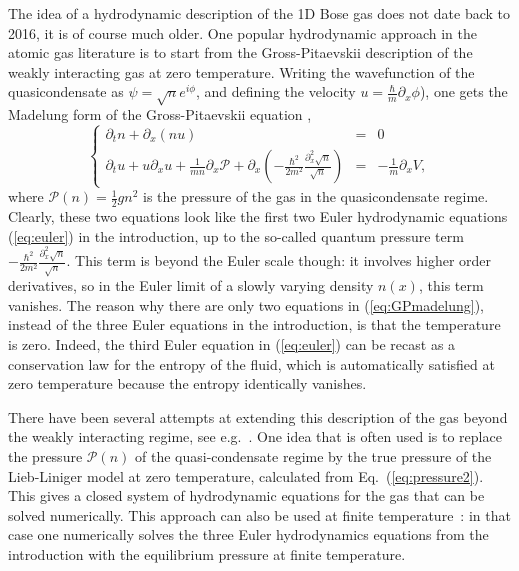 \documentclass[onecolumn,amsfonts,showpacs,superscriptaddress]{revtex4-1}
\begin{document}
The idea of a hydrodynamic description of the 1D Bose gas does not date back to 2016, it is of course much older. One popular hydrodynamic approach in the atomic gas literature is to start from the Gross-Pitaevskii description of the weakly interacting gas at zero temperature. Writing the wavefunction of the quasicondensate as $\psi=\sqrt{n} e^{i \phi}$, and defining the velocity $u= \frac{\hbar}{m} \partial_x \phi$), one gets the Madelung form of the Gross-Pitaevskii equation \citep{stringari1996collective,stringari1998dynamics,cazalilla2011one},
\begin{equation}
    \label{eq:GPmadelung}
    \left\{\begin{array}{rcl}
            \partial_t n + \partial_x (n u) & = & 0 \\
            \partial_t u + u \partial_x u + \frac{1}{m n} \partial_x \mathcal{P} + \partial_x \left( - \frac{\hbar^2}{2m^2} \frac{\partial_x^2 \sqrt{n}}{\sqrt{n}} \right) &= & - \frac{1}{m} \partial_x V ,
    \end{array}\right.
\end{equation}
where $\mathcal{P}(n) = \frac{1}{2}g n^2$ is the pressure of the gas in the quasicondensate regime. Clearly, these two equations look like the first two Euler hydrodynamic equations (\ref{eq:euler}) in the introduction, up to the so-called quantum pressure term $- \frac{\hbar^2}{2m^2} \frac{\partial_x^2 \sqrt{n}}{\sqrt{n}} $. This term is beyond the Euler scale though: it involves higher order derivatives, so in the Euler limit of a slowly varying density $n(x)$, this term vanishes. The reason why there are only two equations in (\ref{eq:GPmadelung}), instead of the three Euler equations in the introduction, is that the temperature is zero. Indeed, the third Euler equation in (\ref{eq:euler}) can be recast as a conservation law for the entropy of the fluid, which is automatically satisfied at zero temperature because the entropy identically vanishes.


There have been several attempts at extending this description of the gas beyond the weakly interacting regime, see e.g.~\citep{kolomeisky2000low,menotti2002collective,damski2006shock}. One idea that is often used \citep{menotti2002collective,ohberg2002dynamical,pedri2003violation,damski2006shock,peotta2014quantum,sarishvili2016pulse} is to replace the pressure $\mathcal{P}(n)$ of the quasi-condensate regime by the true pressure of the Lieb-Liniger model at zero temperature, calculated from Eq.~(\ref{eq:pressure2}). This gives a closed system of hydrodynamic equations for the gas that can be solved numerically. This approach can also be used at finite temperature~\citep{bouchoule_finite-temperature_2016,doyon2017large,schemmer2019generalized}: in that case one numerically solves the three Euler hydrodynamics equations from the introduction with the equilibrium pressure at finite temperature.
\end{document}
